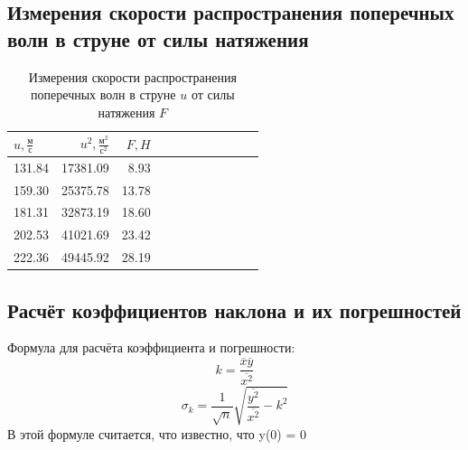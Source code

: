 \documentclass[12pt]{article}
\begin{document}
\subsection{Измерения скорости распространения поперечных волн в струне от силы натяжения} \label{app_2}
\begin{table}[H]
    \centering
    \begin{tabular}{|l|r|r|r|r|r|r|r|r|r|r|}
        \hline
        $u, \frac{\textrm{м}}{\textrm{с}}$ & $u^2, \frac{\textrm{м}^2}{\textrm{с}^2}$ & $F, H$ \\
        \hline
        131.84                             & 17381.09                                 & 8.93   \\
        159.30                             & 25375.78                                 & 13.78  \\
        181.31                             & 32873.19                                 & 18.60  \\
        202.53                             & 41021.69                                 & 23.42  \\
        222.36                             & 49445.92                                 & 28.19  \\
        \hline
        
    \end{tabular}
    \caption{Измерения скорости распространения поперечных волн в струне $u$ от силы натяжения $F$}
    \label{tab:2}
\end{table}
\subsection{Расчёт коэффициентов наклона и их погрешностей}\label{app_3}
Формула для расчёта коэффициента и погрешности:
$$k = \frac{\overline{x}\overline{y}}{\overline{x^2}}$$
$$\sigma_k = \frac{1}{\sqrt{n}}\sqrt{\frac{\overline{y^2}}{\overline{x^2}} - k^2}$$
В этой формуле считается, что известно, что y(0) = 0
\end{document}
